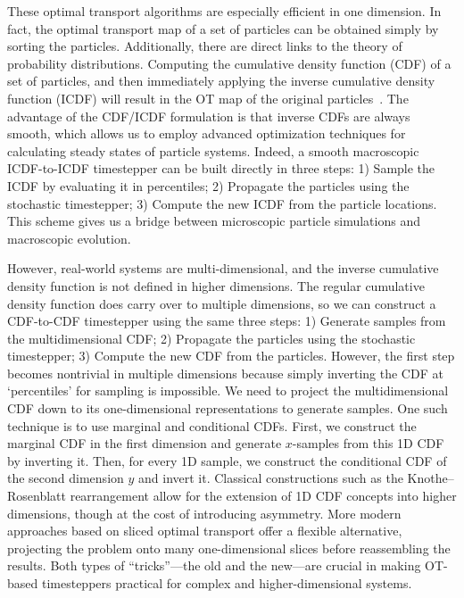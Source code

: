 \documentclass{article}
\begin{document}
These optimal transport algorithms are especially efficient in one dimension. In fact, the optimal transport map of a set of particles can be obtained simply by sorting the particles. Additionally, there are direct links to the theory of probability distributions. Computing the cumulative density function (CDF) of a set of particles, and then immediately applying the inverse cumulative density function (ICDF) will result in the OT map of the original particles~\cite{}. The advantage of the CDF/ICDF formulation is that inverse CDFs are always smooth, which allows us to employ advanced optimization techniques for calculating steady states of particle systems. Indeed, a smooth macroscopic ICDF-to-ICDF timestepper can be built directly in three steps: 1) Sample the ICDF by evaluating it in percentiles; 2) Propagate the particles using the stochastic timestepper; 3) Compute the new ICDF from the particle locations. This scheme gives us a bridge between microscopic particle simulations and macroscopic evolution.

However, real-world systems are multi-dimensional, and the inverse cumulative density function is not defined in higher dimensions. The regular cumulative density function does carry over to multiple dimensions, so we can construct a CDF-to-CDF timestepper using the same three steps: 1) Generate samples from the multidimensional CDF; 2) Propagate the particles using the stochastic timestepper; 3) Compute the new CDF from the particles. However, the first step becomes nontrivial in multiple dimensions because simply inverting the CDF at `percentiles' for sampling is impossible. We need to project the multidimensional CDF down to its one-dimensional representations to generate samples. One such technique is to use marginal and conditional CDFs. First, we construct the marginal CDF in the first dimension and generate $x$-samples from this 1D CDF by inverting it. Then, for every 1D sample, we construct the conditional CDF of the second dimension $y$ and invert it. Classical constructions such as the Knothe–Rosenblatt rearrangement allow for the extension of 1D CDF concepts into higher dimensions, though at the cost of introducing asymmetry. More modern approaches based on sliced optimal transport offer a flexible alternative, projecting the problem onto many one-dimensional slices before reassembling the results. Both types of “tricks”—the old and the new—are crucial in making OT-based timesteppers practical for complex and higher-dimensional systems.
\end{document}
